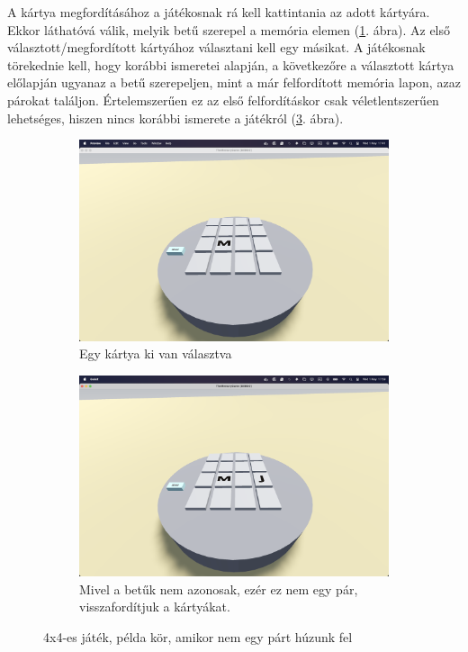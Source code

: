 A kártya megfordításához a játékosnak rá kell kattintania az adott kártyára. 
Ekkor láthatóvá válik, melyik betű szerepel a memória elemen (\ref{img:kartya_fliped}. ábra). 
Az első választott/megfordított kártyához választani kell egy másikat. A játékosnak törekednie kell, hogy korábbi ismeretei alapján, a következőre a választott kártya előlapján ugyanaz a betű szerepeljen, mint a már felfordított memória lapon, azaz párokat találjon.
Értelemszerűen ez az első felfordításkor csak véletlentszerűen lehetséges, hiszen nincs korábbi ismerete a játékról (\ref{img:non_pair}. ábra).
\begin{figure}[h]
\begin{subfigure}[t]{0.5\textwidth}
    \includegraphics[width=\linewidth]{img/asztal_4x4_card_flipped.png}
    \caption{Egy kártya ki van választva}
    \label{img:kartya_fliped}
\end{subfigure}
\begin{subfigure}[t]{0.5\textwidth}
    \includegraphics[width=\linewidth]{img/asztal_4x4_non_pair.png}
    \caption{Mivel a betűk nem azonosak, ezér ez nem egy pár, visszafordítjuk a kártyákat.}
    \label{img:non_pair}
\end{subfigure}
\caption{4x4-es játék, példa kör, amikor nem egy párt húzunk fel}
\end{figure}
